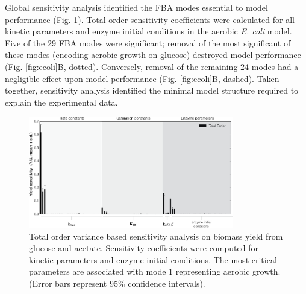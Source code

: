 \documentclass[10pt,twocolumn,twoside,final]{IEEEtran}
\begin{document}
Global sensitivity analysis identified the FBA modes essential to model performance (Fig. \ref{fig:sensitivity}).
Total order sensitivity coefficients were calculated for all kinetic parameters and enzyme initial conditions in the aerobic \textit{E. coli} model.
Five of the 29 FBA modes were significant;
removal of the most significant of these modes (encoding aerobic growth on glucose) destroyed model performance (Fig. \ref{fig:ecoli}B, dotted).
Conversely, removal of the remaining 24 modes had a negligible effect upon model performance (Fig. \ref{fig:ecoli}B, dashed).
Taken together, sensitivity analysis identified the minimal model structure required to explain the experimental data.

\begin{figure}[!t]\centering
\includegraphics[width=0.80\textwidth]{./figs/Fig-3-Sensitivity-Results.pdf}
\caption{Total order variance based sensitivity analysis on biomass yield from glucose and acetate.
Sensitivity coefficients were computed for kinetic parameters and enzyme initial conditions.
The most critical parameters are associated with mode 1 representing aerobic growth. (Error bars represent 95\% confidence intervals).
}
\label{fig:sensitivity}
\end{figure}
\end{document}
